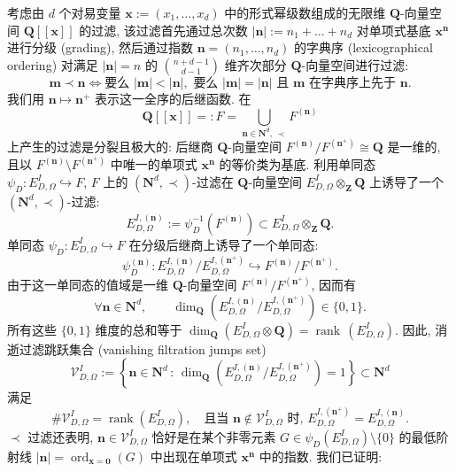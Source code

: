 考虑由 \(d\) 个对易变量 \(\mathbf{x} := (x_1, \dots, x_d)\) 中的形式幂级数组成的无限维 \(\mathbf{Q}\)-向量空间 \(\mathbf{Q}[\![\mathbf{x}]\!]\) 的过滤, 
该过滤首先通过总次数 \(|\mathbf{n}| := n_1 + \dots + n_d\) 对单项式基底 \(\mathbf{x}^{\mathbf{n}}\) 进行分级 (grading), 
然后通过指数 \(\mathbf{n} = (n_1,\ldots,n_d)\) 的字典序 (lexicographical ordering) 对满足 \(|\mathbf{n}|=n\) 的 \(\binom{n+d-1}{d-1}\) 维齐次部分 \(\mathbf{Q}\)-向量空间进行过滤:
\[ \mathbf{m} \prec \mathbf{n} \iff \text{要么 } |\mathbf{m}| < |\mathbf{n}|, \text{ 要么 } |\mathbf{m}| = |\mathbf{n}| \text{ 且 } \mathbf{m} \text{ 在字典序上先于 } \mathbf{n}. \]
我们用 \(\mathbf{n} \mapsto \mathbf{n}^+\) 表示这一全序的后继函数. 在
\[ \mathbf{Q}[\![\mathbf{x}]\!] =: F = \bigcup_{\mathbf{n} \in \mathbf{N}^d, \, \prec} F^{(\mathbf{n})} \]
上产生的过滤是分裂且极大的: 后继商 \(\mathbf{Q}\)-向量空间 \(F^{(\mathbf{n})}/F^{(\mathbf{n}^+)} \cong \mathbf{Q}\) 是一维的, 且以 \(F^{(\mathbf{n})} \setminus F^{(\mathbf{n}^+)}\) 中唯一的单项式 \(\mathbf{x}^{\mathbf{n}}\) 的等价类为基底. 
利用单同态 \(\psi_D: E^I_{D,\Omega} \hookrightarrow F\), \(F\) 上的 \((\mathbf{N}^d, \prec)\)-过滤在 \(\mathbf{Q}\)-向量空间 \(E_{D,\Omega}^I \otimes_{\mathbf{Z}} \mathbf{Q}\) 上诱导了一个 \((\mathbf{N}^d, \prec)\)-过滤:
\[ E_{D,\Omega}^{I,(\mathbf{n})} := \psi_D^{-1} \left( F^{(\mathbf{n})} \right) \subset E_{D,\Omega}^I \otimes_{\mathbf{Z}} \mathbf{Q}. \]
单同态 \(\psi_D: E_{D,\Omega}^I \hookrightarrow F\) 在分级后继商上诱导了一个单同态:
\[ \psi_D^{(\mathbf{n})}: E_{D,\Omega}^{I,(\mathbf{n})}/E_{D,\Omega}^{I,(\mathbf{n}^+)} \hookrightarrow F^{(\mathbf{n})}/F^{(\mathbf{n}^+)}. \]
由于这一单同态的值域是一维 \(\mathbf{Q}\)-向量空间 \(F^{(\mathbf{n})}/F^{(\mathbf{n}^+)}\), 因而有
\begin{equation}\label{eq:3.1.4}
\forall \mathbf{n} \in \mathbf{N}^d, \qquad \dim_{\mathbf{Q}} \left( E_{D,\Omega}^{I,(\mathbf{n})} / E_{D,\Omega}^{I,(\mathbf{n}^+)} \right) \in \{0,1\}.
\end{equation}
所有这些 \(\{0,1\}\) 维度的总和等于 \(\dim_{\mathbf{Q}}(E_{D,\Omega}^I\otimes\mathbf{Q})=\operatorname{rank}\,(E_{D,\Omega}^I)\). 
因此, 消逝过滤跳跃集合 (vanishing filtration jumps set)
\[ \mathcal{V}_{D,\Omega}^{I} := \left\{\mathbf{n} \in \mathbf{N}^{d} \, : \, \dim_{\mathbf{Q}}\left(E_{D,\Omega}^{I,(\mathbf{n})}/E_{D,\Omega}^{I,(\mathbf{n}^{+})}\right) = 1\right\} \subset \mathbf{N}^{d} \]
满足
\begin{equation}\label{eq:3.1.5}
\#\mathcal{V}_{D,\Omega}^I = \operatorname{rank}(E_{D,\Omega}^I), \quad \text{且当 } \mathbf{n} \notin \mathcal{V}_{D,\Omega}^I \text{ 时, } E_{D,\Omega}^{I,(\mathbf{n}^+)} = E_{D,\Omega}^{I,(\mathbf{n})}.
\end{equation}
\(\prec\) 过滤还表明, \(\mathbf{n} \in \mathcal{V}_{D,\Omega}^{I}\) 恰好是在某个非零元素 \(G \in \psi_D\left(E_{D,\Omega}^I\right) \setminus \{0\}\) 的最低阶射线 \(|\mathbf{n}| = \operatorname{ord}_{\mathbf{x} = \mathbf{0}}(G)\) 中出现在单项式 \(\mathbf{x}^{\mathbf{n}}\) 中的指数. 我们已证明:

